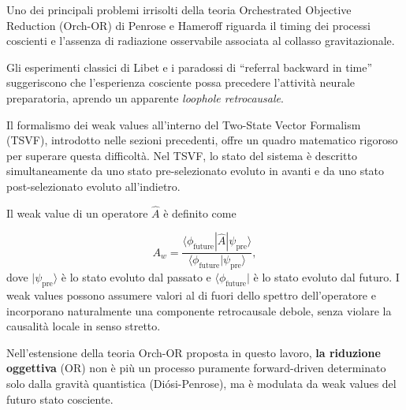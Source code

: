 \documentclass[11pt,a4paper]{article}
\let\oldcite\cite
\renewcommand{\cite}{\protect\oldcite}
\theoremstyle{plain}
\theoremstyle{definition}
\begin{document}
\vspace{0.2cm}

Uno dei principali problemi irrisolti della teoria Orchestrated Objective Reduction (Orch-OR) di Penrose e Hameroff \cite{hameroff_orch_2014} riguarda il timing dei processi coscienti e l’assenza di radiazione osservabile associata al collasso gravitazionale. 


\vspace{0.2cm}

Gli esperimenti classici di Libet e i paradossi di ``referral backward in time'' suggeriscono che l’esperienza cosciente possa precedere l’attività neurale preparatoria, aprendo un apparente \emph{loophole retrocausale}.


Il formalismo dei weak values all’interno del Two-State Vector Formalism (TSVF), introdotto nelle sezioni precedenti, offre un quadro matematico rigoroso per superare questa difficoltà. Nel TSVF, lo stato del sistema è descritto simultaneamente da uno stato pre-selezionato evoluto in avanti e da uno stato post-selezionato evoluto all’indietro. 

\vspace{0.2cm}


Il weak value di un operatore $\hat{A}$ è definito come

\vspace{0.1cm}

\begin{tcolorbox}[colback=blue!3!white, colframe=blue!80!black, 
                  title={\textbf{Weak value nel formalismo TSVF}}, 
                  sharp corners, boxrule=0.9pt, coltitle=white]
\begin{equation}
A_w = \frac{\langle \phi_{\text{future}} | \hat{A} | \psi_{\text{pre}} \rangle}{\langle \phi_{\text{future}} | \psi_{\text{pre}} \rangle},
\label{eq:weak_value}
\end{equation}
dove $|\psi_{\text{pre}}\rangle$ è lo stato evoluto dal passato e $\langle \phi_{\text{future}}|$ è lo stato evoluto dal futuro. I weak values possono assumere valori al di fuori dello spettro dell’operatore e incorporano naturalmente una componente retrocausale debole, senza violare la causalità locale in senso stretto.
\end{tcolorbox}

\vspace{0.2cm}

Nell’estensione della teoria Orch-OR proposta in questo lavoro, \textbf{la riduzione oggettiva} (OR) non è più un processo puramente forward-driven determinato solo dalla gravità quantistica (Diósi-Penrose), ma è modulata da weak values del futuro stato cosciente. 
\end{document}
